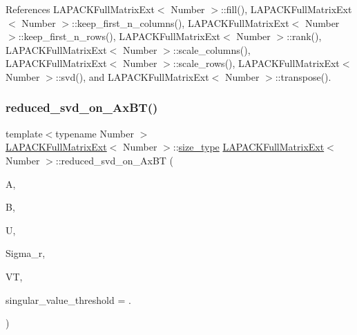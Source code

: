 References L\+A\+P\+A\+C\+K\+Full\+Matrix\+Ext$<$ Number $>$\+::fill(), L\+A\+P\+A\+C\+K\+Full\+Matrix\+Ext$<$ Number $>$\+::keep\+\_\+first\+\_\+n\+\_\+columns(), L\+A\+P\+A\+C\+K\+Full\+Matrix\+Ext$<$ Number $>$\+::keep\+\_\+first\+\_\+n\+\_\+rows(), L\+A\+P\+A\+C\+K\+Full\+Matrix\+Ext$<$ Number $>$\+::rank(), L\+A\+P\+A\+C\+K\+Full\+Matrix\+Ext$<$ Number $>$\+::scale\+\_\+columns(), L\+A\+P\+A\+C\+K\+Full\+Matrix\+Ext$<$ Number $>$\+::scale\+\_\+rows(), L\+A\+P\+A\+C\+K\+Full\+Matrix\+Ext$<$ Number $>$\+::svd(), and L\+A\+P\+A\+C\+K\+Full\+Matrix\+Ext$<$ Number $>$\+::transpose().

\mbox{\label{classLAPACKFullMatrixExt_a355ed6360b21081b6e86e09833bf95db}} 
\subsubsection{\texorpdfstring{reduced\+\_\+svd\+\_\+on\+\_\+\+Ax\+B\+T()}{reduced\_svd\_on\_AxBT()}\hspace{0.1cm}{\footnotesize\ttfamily [1/3]}}
{\footnotesize\ttfamily template$<$typename Number $>$ \\
\hyperlink{classLAPACKFullMatrixExt}{L\+A\+P\+A\+C\+K\+Full\+Matrix\+Ext}$<$ Number $>$\+::\hyperlink{classLAPACKFullMatrixExt_a5cf5f4a6104dc17029210b5ca52bf574}{size\+\_\+type} \hyperlink{classLAPACKFullMatrixExt}{L\+A\+P\+A\+C\+K\+Full\+Matrix\+Ext}$<$ Number $>$\+::reduced\+\_\+svd\+\_\+on\+\_\+\+Ax\+BT (\begin{DoxyParamCaption}\item[{\hyperlink{classLAPACKFullMatrixExt}{L\+A\+P\+A\+C\+K\+Full\+Matrix\+Ext}$<$ Number $>$ \&}]{A,  }\item[{\hyperlink{classLAPACKFullMatrixExt}{L\+A\+P\+A\+C\+K\+Full\+Matrix\+Ext}$<$ Number $>$ \&}]{B,  }\item[{\hyperlink{classLAPACKFullMatrixExt}{L\+A\+P\+A\+C\+K\+Full\+Matrix\+Ext}$<$ Number $>$ \&}]{U,  }\item[{std\+::vector$<$ typename numbers\+::\+Number\+Traits$<$ Number $>$\+::real\+\_\+type $>$ \&}]{Sigma\+\_\+r,  }\item[{\hyperlink{classLAPACKFullMatrixExt}{L\+A\+P\+A\+C\+K\+Full\+Matrix\+Ext}$<$ Number $>$ \&}]{VT,  }\item[{Number}]{singular\+\_\+value\+\_\+threshold = {.} }\end{DoxyParamCaption})\hspace{0.3cm}{\ttfamily [static]}}

